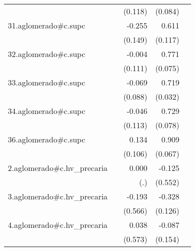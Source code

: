 {\begin{longtable}{l*{4}{D{.}{.}{-1}}}
            &                     &     (0.118)         &     (0.084)         &                     \\
\addlinespace
31.aglomerado#c.supc&                     &      -0.255         &       0.611\sym{***}&                     \\
            &                     &     (0.149)         &     (0.117)         &                     \\
\addlinespace
32.aglomerado#c.supc&                     &      -0.004         &       0.771\sym{***}&                     \\
            &                     &     (0.111)         &     (0.075)         &                     \\
\addlinespace
33.aglomerado#c.supc&                     &      -0.069         &       0.719\sym{***}&                     \\
            &                     &     (0.088)         &     (0.032)         &                     \\
\addlinespace
34.aglomerado#c.supc&                     &      -0.046         &       0.729\sym{***}&                     \\
            &                     &     (0.113)         &     (0.078)         &                     \\
\addlinespace
36.aglomerado#c.supc&                     &       0.134         &       0.909\sym{***}&                     \\
            &                     &     (0.106)         &     (0.067)         &                     \\
\addlinespace
2.aglomerado#c.hv\_precaria&                     &       0.000         &      -0.125         &                     \\
            &                     &         (.)         &     (0.552)         &                     \\
\addlinespace
3.aglomerado#c.hv\_precaria&                     &      -0.193         &      -0.328\sym{**} &                     \\
            &                     &     (0.566)         &     (0.126)         &                     \\
\addlinespace
4.aglomerado#c.hv\_precaria&                     &       0.038         &      -0.087         &                     \\
            &                     &     (0.573)         &     (0.154)         &                     \\

\end{longtable}}
